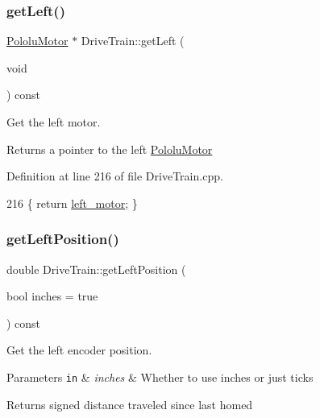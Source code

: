 \subsubsection{\texorpdfstring{get\+Left()}{getLeft()}}
{\footnotesize\ttfamily \hyperlink{class_pololu_motor}{Pololu\+Motor} $\ast$ Drive\+Train\+::get\+Left (\begin{DoxyParamCaption}\item[{void}]{ }\end{DoxyParamCaption}) const}



Get the left motor. 

\begin{DoxyReturn}{Returns}
a pointer to the left \hyperlink{class_pololu_motor}{Pololu\+Motor} 
\end{DoxyReturn}


Definition at line 216 of file Drive\+Train.\+cpp.


\begin{DoxyCode}
216 \{ \textcolor{keywordflow}{return} \hyperlink{class_drive_train_a9532e0208bfc16c308dafe08ba0e1087}{left\_motor}; \}
\end{DoxyCode}
\mbox{\label{class_drive_train_a9ec0f8309cf9670fec618e8b00f70390}} 
\subsubsection{\texorpdfstring{get\+Left\+Position()}{getLeftPosition()}}
{\footnotesize\ttfamily double Drive\+Train\+::get\+Left\+Position (\begin{DoxyParamCaption}\item[{bool}]{inches = {\ttfamily true} }\end{DoxyParamCaption}) const}



Get the left encoder position. 


\begin{DoxyParams}[1]{Parameters}
\mbox{\tt in}  & {\em inches} & Whether to use inches or just ticks \\
\hline
\end{DoxyParams}
\begin{DoxyReturn}{Returns}
signed distance traveled since last homed 
\end{DoxyReturn}


